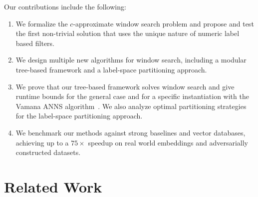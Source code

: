 \documentclass{article}
\theoremstyle{plain}
\theoremstyle{definition}
\theoremstyle{remark}
\begin{document}
Our contributions include the following:
\begin{enumerate}[topsep=1pt,itemsep=0pt,parsep=0pt,leftmargin=10pt]

    \item We formalize the $c$-approximate window search problem and propose and test the first non-trivial solution that uses the unique nature of numeric label based filters.

    \item We design multiple new algorithms for window search, including a modular tree-based framework and a label-space partitioning approach.

    \item We prove that our tree-based framework solves window search and give runtime bounds for the general case and for a specific instantiation with the Vamana ANNS algorithm~\cite{diskann}. 
    We also analyze optimal partitioning strategies for the label-space partitioning approach.
    
    \item We benchmark our methods against strong baselines and vector databases, achieving up to a $75\times$ speedup on real world embeddings and adversarially constructed datasets. 
\end{enumerate}


\section{Related Work}\label{sec:related}
 
\end{document}
